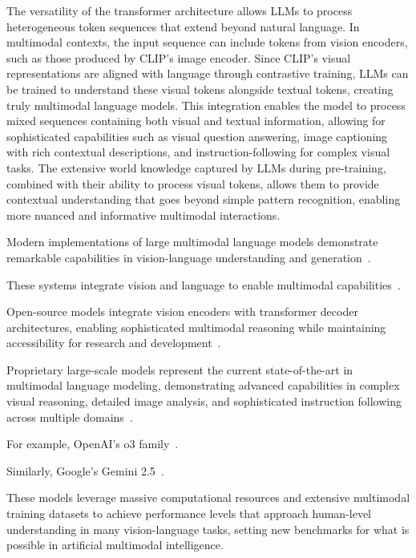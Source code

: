The versatility of the transformer architecture allows LLMs to process heterogeneous token sequences that extend beyond natural language. In multimodal contexts, the input sequence can include tokens from vision encoders, such as those produced by CLIP's image encoder. Since CLIP's visual representations are aligned with language through contrastive training, LLMs can be trained to understand these visual tokens alongside textual tokens, creating truly multimodal language models. This integration enables the model to process mixed sequences containing both visual and textual information, allowing for sophisticated capabilities such as visual question answering, image captioning with rich contextual descriptions, and instruction-following for complex visual tasks. The extensive world knowledge captured by LLMs during pre-training, combined with their ability to process visual tokens, allows them to provide contextual understanding that goes beyond simple pattern recognition, enabling more nuanced and informative multimodal interactions.

Modern implementations of large multimodal language models demonstrate remarkable capabilities in vision-language understanding and generation~\cite{gemma3,o3,gemini25}.

These systems integrate vision and language to enable multimodal capabilities~\cite{clip,siglip}.

Open-source models integrate vision encoders with transformer decoder architectures, enabling sophisticated multimodal reasoning while maintaining accessibility for research and development~\cite{gemma3,siglip,siglip2}.

Proprietary large-scale models represent the current state-of-the-art in multimodal language modeling, demonstrating advanced capabilities in complex visual reasoning, detailed image analysis, and sophisticated instruction following across multiple domains~\cite{o3}.

For example, OpenAI's o3 family~\cite{o3}.

Similarly, Google's Gemini 2.5~\cite{gemini25}.

These models leverage massive computational resources and extensive multimodal training datasets to achieve performance levels that approach human-level understanding in many vision-language tasks, setting new benchmarks for what is possible in artificial multimodal intelligence.

